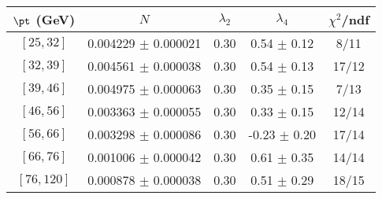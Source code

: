 \begin{tabular}{c||c|c|c|c}
$\pt$ (GeV) & $N$ & $\lambda_{2}$ & $\lambda_4$  & $\chi^2$/ndf  \\
\hline
$[25, 32]$ & 0.004229 $\pm$ 0.000021 & 0.30 & 0.54 $\pm$ 0.12 & 8/11\\
$[32, 39]$ & 0.004561 $\pm$ 0.000038 & 0.30 & 0.54 $\pm$ 0.13 & 17/12\\
$[39, 46]$ & 0.004975 $\pm$ 0.000063 & 0.30 & 0.35 $\pm$ 0.15 & 7/13\\
$[46, 56]$ & 0.003363 $\pm$ 0.000055 & 0.30 & 0.33 $\pm$ 0.15 & 12/14\\
$[56, 66]$ & 0.003298 $\pm$ 0.000086 & 0.30 & -0.23 $\pm$ 0.20 & 17/14\\
$[66, 76]$ & 0.001006 $\pm$ 0.000042 & 0.30 & 0.61 $\pm$ 0.35 & 14/14\\
$[76, 120]$ & 0.000878 $\pm$ 0.000038 & 0.30 & 0.51 $\pm$ 0.29 & 18/15\\
\end{tabular}
